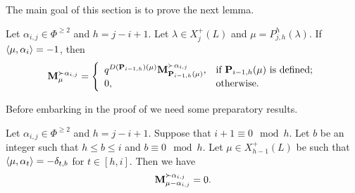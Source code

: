 The main goal of this section is to prove the next lemma. 

\begin{lemma}\rm\label{lem: bfP}
  Let $\alpha_{i,j}\in \Phi^{\geq 2}$ and $h=j-i+1$.
  Let  $\lambda \in X_{j}^+(L)$ and  $\mu = P^{h}_{j,h}(\lambda)$.
  If $\langle \mu , \alpha_{i} \rangle = -1$, then
    \begin{equation}\label{eq: bfP}
        \mathbf{M}_{\mu}^{\succ \alpha_{i,j}} = \left\{ \begin{array}{ll}
            q^{D(\mathbf{P}_{i-1,h})(\mu)}\mathbf{M}_{\mathbf{P}_{i-1,h}(\mu)}^{\succ \alpha_{i,j}}, & \text{if } \mathbf{P}_{i-1,h}(\mu) \text{ is defined;} \\[2pt]
            0, & \text{otherwise.}
        \end{array}\right.
    \end{equation}
\end{lemma}

Before embarking in the  proof of  we need some preparatory results. 

\begin{lemma}\rm\label{lem: blackP caso 0}
    Let $\alpha_{i,j}\in \Phi^{\geq 2}$  and  $h=j-i+1$.
    Suppose that  $i+1\equiv 0 \mod h$.  
    Let $b$ be an integer such that $h \leq b \leq i$ and $ b\equiv 0 \mod{h}$.
    Let $\mu\in X_{h-1}^{+}(L) $  be such that $\langle \mu , \alpha_t \rangle=-\delta_{t,b}$ for $t\in [h,i]$. 
    Then we have
    \begin{equation}\label{eq: first caso 0 blackP}
        \mathbf{M}_{\mu - \alpha_{i,j}}^{\succ \alpha_{i,j}} = 0.
    \end{equation}
\end{lemma}


